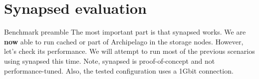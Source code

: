 \section{Synapsed evaluation}

\begin{frame}{Benchmark preamble}
	The most important part is that synapsed works. We are \textbf{now} able to
	run cached or part of Archipelago in the storage nodes.
	\dspc
	However, let's check its performance.
	\spc
	We will attempt to run most of the previous scenarios using synapsed this 
	time.
	\dspc
	Note, synapsed is proof-of-concept and not performance-tuned. Also, the 
	tested configuration uses a 1Gbit connection.
\end{frame}

